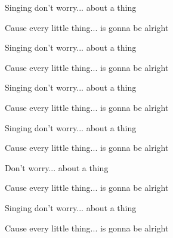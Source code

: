 \begin{song}
\bigskip

Singing don't worry... about a thing \par
Cause every little thing... is gonna be alright \par
Singing don't worry... about a thing \par
Cause every little thing... is gonna be alright \par

\bigskip

Singing don't worry... about a thing \par
Cause every little thing... is gonna be alright \par
Singing don't worry... about a thing \par
Cause every little thing... is gonna be alright \par

\bigskip

Don't worry... about a thing \par
Cause every little thing... is gonna be alright \par
Singing don't worry... about a thing \par
Cause every little thing... is gonna be alright \par

\end{song}